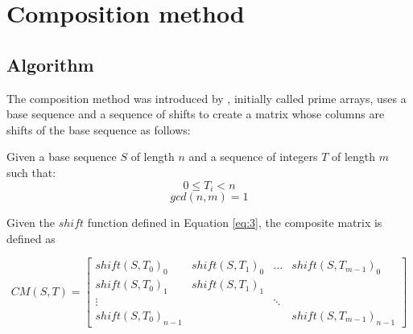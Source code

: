 \section{Composition method}

\subsection{Algorithm}

The composition method  was introduced by \citet{tirkel_composition}, initially called prime
arrays,  uses a base sequence and a sequence of shifts to create a matrix  whose columns are 
shifts of the base sequence as follows:

\begin{definition}
  Given a base sequence $S$ of length $n$ and a sequence of integers $T$ of
  length $m$ such that:
  \begin{equation}\label{composition:eq:1}
    0 \leq T_{i} < n
  \end{equation}
  \begin{equation}\label{composition:eq:2}
    gcd(n, m) = 1
  \end{equation}

  Given the $shift$ function defined in Equation \eqref{eq:3},
   the composite matrix is defined as

  \begin{equation}\label{composition:eq:3}
    CM(S, T) = \begin{bmatrix}
      shift(S, T_{0})_{0} & shift(S, T_{1})_{0} & \dots & shift(S, T_{m-1})_{0} \\
      shift(S, T_{0})_{1} & shift(S, T_{1})_{1} \\
      \vdots & & \ddots \\
      shift(S, T_{0})_{n-1} & & & shift(S, T_{m-1})_{n-1}
    \end{bmatrix}
  \end{equation}

\end{definition}

